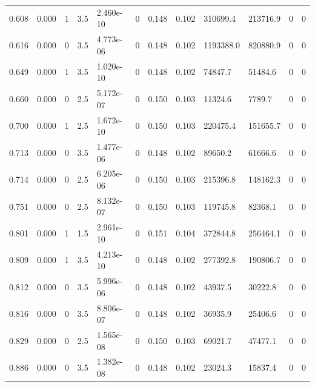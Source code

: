 \documentclass[preview]{standalone}
\begin{document}
{{\begin{tabular}{L{1.2cm}C{1.2cm} C{0.3cm}C{0.5cm} C{1.4cm}C{1.4cm} C{1.4cm}C{1.4cm} C{1.6cm}C{1.6cm} C{1.6cm}C{1.6cm}}
  0.608  &  0.000  & 1     & 3.5 &  2.460e-10  & 0  &  0.148&   0.102& 310699.4 & 213716.9   &  0 & 0  \\ 
  0.616  &  0.000  & 0     & 3.5 &  4.773e-06  & 0  &  0.148&   0.102& 1193388.0 & 820880.9   &  0 & 0  \\ 
  0.649  &  0.000  & 1     & 3.5 &  1.020e-10  & 0  &  0.148&   0.102& 74847.7 & 51484.6   &  0 & 0  \\ 
  0.660  &  0.000  & 0     & 2.5 &  5.172e-07  & 0  &  0.150&   0.103& 11324.6 & 7789.7   &  0 & 0  \\ 
  0.700  &  0.000  & 1     & 2.5 &  1.672e-10  & 0  &  0.150&   0.103& 220475.4 & 151655.7   &  0 & 0  \\ 
  0.713  &  0.000  & 0     & 3.5 &  1.477e-06  & 0  &  0.148&   0.102& 89650.2 & 61666.6   &  0 & 0  \\ 
  0.714  &  0.000  & 0     & 2.5 &  6.205e-06  & 0  &  0.150&   0.103& 215396.8 & 148162.3   &  0 & 0  \\ 
  0.751  &  0.000  & 0     & 2.5 &  8.132e-07  & 0  &  0.150&   0.103& 119745.8 & 82368.1   &  0 & 0  \\ 
  0.801  &  0.000  & 1     & 1.5 &  2.961e-10  & 0  &  0.151&   0.104& 372844.8 & 256464.1   &  0 & 0  \\ 
  0.809  &  0.000  & 1     & 3.5 &  4.213e-10  & 0  &  0.148&   0.102& 277392.8 & 190806.7   &  0 & 0  \\ 
  0.812  &  0.000  & 0     & 3.5 &  5.996e-06  & 0  &  0.148&   0.102& 43937.5 & 30222.8   &  0 & 0  \\ 
  0.816  &  0.000  & 0     & 3.5 &  8.806e-07  & 0  &  0.148&   0.102& 36935.9 & 25406.6   &  0 & 0  \\ 
  0.829  &  0.000  & 0     & 2.5 &  1.565e-08  & 0  &  0.150&   0.103& 69021.7 & 47477.1   &  0 & 0  \\ 
  0.886  &  0.000  & 0     & 3.5 &  1.382e-08  & 0  &  0.148&   0.102& 23024.3 & 15837.4   &  0 & 0  \\ 
\hline 
\end{tabular} 

}}
\end{document}
